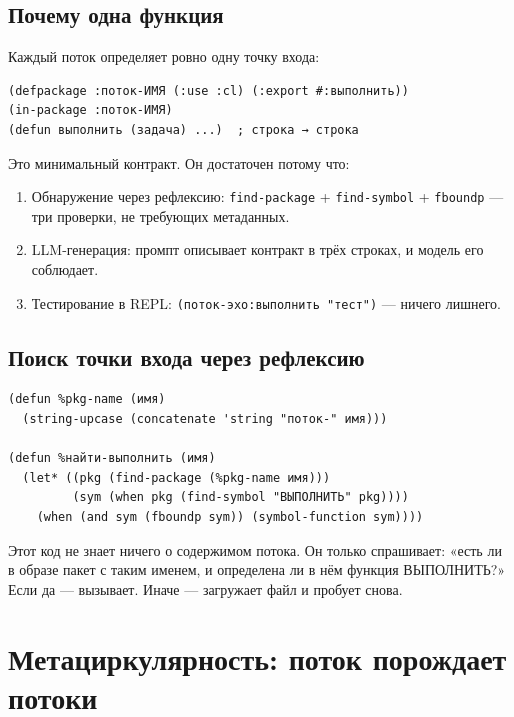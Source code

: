 \documentclass[11pt,a4paper]{article}
\begin{document}
\subsection{Почему одна функция}

Каждый поток определяет ровно одну точку входа:

\begin{lstlisting}
(defpackage :поток-ИМЯ (:use :cl) (:export #:выполнить))
(in-package :поток-ИМЯ)
(defun выполнить (задача) ...)  ; строка → строка
\end{lstlisting}

Это минимальный контракт. Он достаточен потому что:

\begin{enumerate}[noitemsep]
  \item Обнаружение через рефлексию: \texttt{find-package} + \texttt{find-symbol} + \texttt{fboundp} — три проверки, не требующих метаданных.
  \item LLM-генерация: промпт описывает контракт в трёх строках, и модель его соблюдает.
  \item Тестирование в REPL: \texttt{(поток-эхо:выполнить "тест")} — ничего лишнего.
\end{enumerate}

\subsection{Поиск точки входа через рефлексию}

\begin{lstlisting}[caption={мастер/cl/потоки.lisp — рефлексия без метаданных}]
(defun %pkg-name (имя)
  (string-upcase (concatenate 'string "поток-" имя)))

(defun %найти-выполнить (имя)
  (let* ((pkg (find-package (%pkg-name имя)))
         (sym (when pkg (find-symbol "ВЫПОЛНИТЬ" pkg))))
    (when (and sym (fboundp sym)) (symbol-function sym))))
\end{lstlisting}

Этот код не знает ничего о содержимом потока. Он только спрашивает: «есть ли в образе пакет с таким именем, и определена ли в нём функция ВЫПОЛНИТЬ?» Если да — вызывает. Иначе — загружает файл и пробует снова.

\section{Метациркулярность: поток порождает потоки}
\label{sec:meta}
\end{document}
